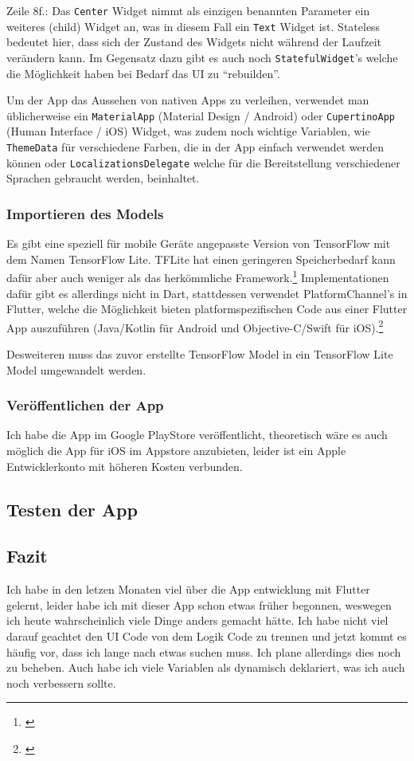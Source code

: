 Zeile 8f.: Das \texttt{Center} Widget nimmt als einzigen benannten Parameter ein weiteres (child) Widget an, was in diesem Fall ein \texttt{Text} Widget ist. Stateless bedeutet hier, dass sich der Zustand des Widgets nicht während der Laufzeit verändern kann. Im Gegensatz dazu gibt es auch noch \texttt{StatefulWidget}'s welche die Möglichkeit haben bei Bedarf das UI zu "`rebuilden"'.

Um der App das Aussehen von nativen Apps zu verleihen, verwendet man üblicherweise ein \texttt{MaterialApp} (Material Design / Android) oder \texttt{CupertinoApp} (Human Interface / iOS) Widget, was zudem noch wichtige Variablen, wie \texttt{ThemeData} für verschiedene Farben, die in der App einfach verwendet werden können oder \texttt{LocalizationsDelegate} welche für die Bereitstellung verschiedener Sprachen gebraucht werden, beinhaltet.

\subsubsection{Importieren des Models}

Es gibt eine speziell für mobile Geräte angepasste Version von TensorFlow mit dem Namen TensorFlow Lite. TFLite hat einen geringeren Speicherbedarf kann dafür aber auch weniger als das herkömmliche Framework.\footnote{\cite{tflite}} Implementationen dafür gibt es allerdings nicht in Dart, stattdessen verwendet PlatformChannel's in Flutter, welche die Möglichkeit bieten platformspezifischen Code aus einer Flutter App auszuführen (Java/Kotlin für Android und Objective-C/Swift für iOS).\footnote{\cite{flutterplatformcode}}

Desweiteren muss das zuvor erstellte TensorFlow Model in ein TensorFlow Lite Model umgewandelt werden.

\subsubsection{Veröffentlichen der App}

Ich habe die App im Google PlayStore veröffentlicht, theoretisch wäre es auch möglich die App für iOS im Appstore anzubieten, leider ist ein Apple Entwicklerkonto mit höheren Kosten verbunden.

\subsection{Testen der App}

\subsection{Fazit}

Ich habe in den letzen Monaten viel über die App entwicklung mit Flutter gelernt, leider habe ich mit dieser App schon etwas früher begonnen, weswegen ich heute wahrscheinlich viele Dinge anders gemacht hätte. Ich habe nicht viel darauf geachtet den UI Code von dem Logik Code zu trennen und jetzt kommt es häufig vor, dass ich lange nach etwas suchen muss. Ich plane allerdings dies noch zu beheben. Auch habe ich viele Variablen als dynamisch deklariert, was ich auch noch verbessern sollte.